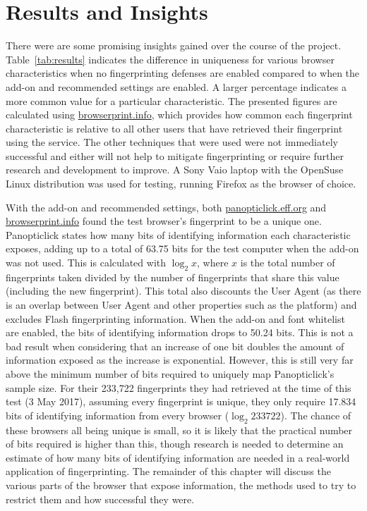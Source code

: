 \chapter{Results and Insights}

There were are some promising insights gained over the course of the project.
Table~\ref{tab:results} indicates the difference in uniqueness for various browser characteristics when no fingerprinting defenses are enabled compared to when the add-on and recommended settings are enabled.
A larger percentage indicates a more common value for a particular characteristic.
The presented figures are calculated using \url{browserprint.info}, which provides how common each fingerprint characteristic is relative to all other users that have retrieved their fingerprint using the service.
The other techniques that were used were not immediately successful and either will not help to mitigate fingerprinting or require further research and development to improve.
A Sony Vaio laptop with the OpenSuse Linux distribution was used for testing, running Firefox as the browser of choice.

With the add-on and recommended settings, both \url{panopticlick.eff.org} and \url{browserprint.info} found the test browser's fingerprint to be a unique one.
Panopticlick states how many bits of identifying information each characteristic exposes, adding up to a total of 63.75 bits for the test computer when the add-on was not used.
This is calculated with $\log_{2}x$, where $x$ is the total number of fingerprints taken divided by the number of fingerprints that share this value (including the new fingerprint).
This total also discounts the User Agent (as there is an overlap between User Agent and other properties such as the platform) and excludes Flash fingerprinting information.
When the add-on and font whitelist are enabled, the bits of identifying information drops to 50.24 bits.
This is not a bad result when considering that an increase of one bit doubles the amount of information exposed as the increase is exponential.
However, this is still very far above the minimum number of bits required to uniquely map Panopticlick's sample size.
For their 233,722 fingerprints they had retrieved at the time of this test (3 May 2017), assuming every fingerprint is unique, they only require 17.834 bits of identifying information from every browser ($\log_{2}233722$).
The chance of these browsers all being unique is small, so it is likely that the practical number of bits required is higher than this, though research is needed to determine an estimate of how many bits of identifying information are needed in a real-world application of fingerprinting.
The remainder of this chapter will discuss the various parts of the browser that expose information, the methods used to try to restrict them and how successful they were.

